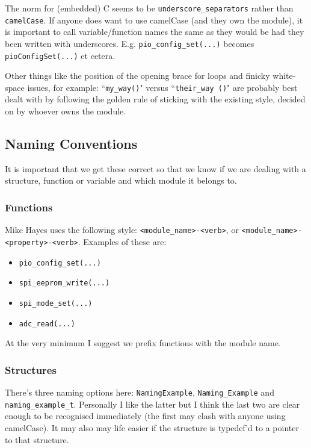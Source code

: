 \documentclass[10pt]{article}
\begin{document}
The norm for (embedded) C seems to be \texttt{underscore\_separators} rather than \texttt{camelCase}. If anyone does want to use camelCase (and they own the module), it is important to call variable/function names the same as they would be had they been written with underscores. E.g. \texttt{pio\_config\_set(...)} becomes \texttt{pioConfigSet(...)} et cetera.

Other things like the position of the opening brace for loops and finicky white-space issues, for example: ``\texttt{my\_way()}" versus ``\texttt{their\_way ()}" are probably best dealt with by following the golden rule of sticking with the existing style, decided on by whoever owns the module.

\subsection{Naming Conventions}
It is important that we get these correct so that we know if we are dealing with a structure, function or variable and which module it belongs to.
\subsubsection{Functions}
Mike Hayes uses the following style: \texttt{<module\_name>-<verb>}, or \texttt{<module\_name>-<property>-<verb>}. Examples of these are:
\begin{itemize}
  \item \texttt{pio\_config\_set(...)}
  \item \texttt{spi\_eeprom\_write(...)}
  \item \texttt{spi\_mode\_set(...)}
  \item \texttt{adc\_read(...)}
\end{itemize}
At the very minimum I suggest we prefix functions with the module name.
\subsubsection{Structures}
There's three naming options here: \texttt{NamingExample}, \texttt{Naming\_Example} and \texttt{naming\_example\_t}. Personally I like the latter but I think the last two are clear enough to be recognised immediately (the first may clash with anyone using camelCase). It may also may life easier if the structure is typedef'd to a pointer to that structure.
\end{document}

